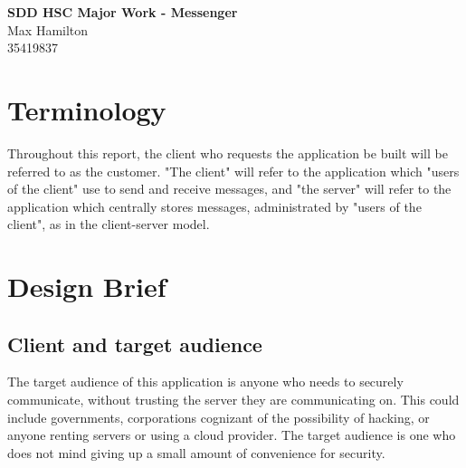 \documentclass{article}
\begin{document}
\begin{titlepage}
    \begin{center}
        { \Huge\textbf{
            SDD HSC Major Work - Messenger
        }}\\[0.5cm]
        { \huge
            Max Hamilton\\[0.3cm]
            35419837
        }
    \end{center}
    
\end{titlepage}
\tableofcontents
\newpage
\section{Terminology}
Throughout this report, the client who requests the application be built will be referred to as the customer. "The client" will refer to the application which "users of the client" use to send and receive messages, and "the server" will refer to the application which centrally stores messages, administrated by "users of the client", as in the client-server model.\\
\section{Design Brief}
\subsection{Client and target audience}
The target audience of this application is anyone who needs to securely communicate, without trusting the server they are communicating on. This could include governments, corporations cognizant of the possibility of hacking, or anyone renting servers or using a cloud provider. The target audience is one who does not mind giving up a small amount of convenience for security.
\end{document}
